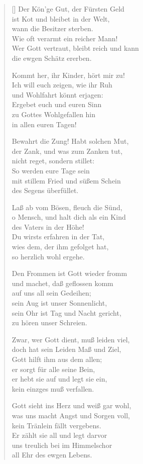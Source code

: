 \begin{multicols}{2}
\begin{verse}[\versewidth]
 Der Kön'ge Gut, der Fürsten Geld\\
ist Kot und bleibet in der Welt,\\
wann die Besitzer sterben.\\
Wie oft verarmt ein reicher Mann!\\
Wer Gott vertraut, bleibt reich und kann\\
die ewgen Schätz ererben.

 Kommt her, ihr Kinder, hört mir zu!\\
Ich will euch zeigen, wie ihr Ruh\\
und Wohlfahrt könnt erjagen:\\
Ergebet euch und euren Sinn\\
zu Gottes Wohlgefallen hin\\
in allen euren Tagen!

 Bewahrt die Zung! Habt solchen Mut,\\
der Zank, und was zum Zanken tut,\\
nicht reget, sondern stillet:\\
So werden eure Tage sein\\
mit stillem Fried und süßem Schein\\
des Segens überfüllet.

 Laß ab vom Bösen, fleuch die Sünd,\\
o Mensch, und halt dich als ein Kind\\
des Vaters in der Höhe!\\
Du wirsts erfahren in der Tat,\\
wies dem, der ihm gefolget hat,\\
so herzlich wohl ergehe.

 Den Frommen ist Gott wieder fromm\\
und machet, daß geflossen komm\\
auf uns all sein Gedeihen;\\
sein Aug ist unser Sonnenlicht,\\
sein Ohr ist Tag und Nacht gericht,\\
zu hören unser Schreien.

 Zwar, wer Gott dient, muß leiden viel,\\
doch hat sein Leiden Maß und Ziel,\\
Gott hilft ihm aus dem allen;\\
er sorgt für alle seine Bein,\\
er hebt sie auf und legt sie ein,\\
kein einzges muß verfallen.

 Gott sieht ins Herz und weiß gar wohl,\\
was uns macht Angst und Sorgen voll,\\
kein Tränlein fällt vergebens.\\
Er zählt sie all und legt darvor\\
uns treulich bei im Himmelschor\\
all Ehr des ewgen Lebens.

\end{verse}
\end{multicols}
